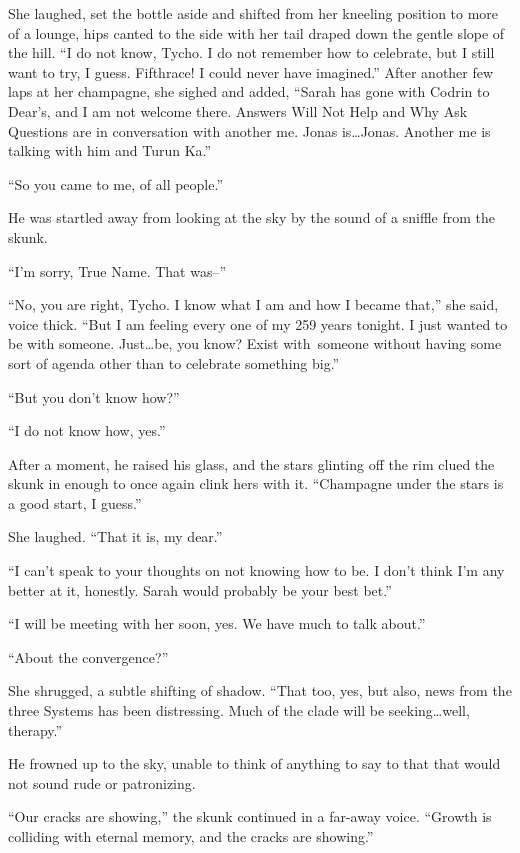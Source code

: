 She laughed, set the bottle aside and shifted from her kneeling position to more of a lounge, hips canted to the side with her tail draped down the gentle slope of the hill. ``I do not know, Tycho. I do not remember how to celebrate, but I still want to try, I guess. Fifthrace! I could never have imagined.'' After another few laps at her champagne, she sighed and added, ``Sarah has gone with Codrin to Dear's, and I am not welcome there. Answers Will Not Help and Why Ask Questions are in conversation with another me. Jonas is\ldots Jonas. Another me is talking with him and Turun Ka.''

``So you came to me, of all people.''

He was startled away from looking at the sky by the sound of a sniffle from the skunk.

``I'm sorry, True Name. That was--''

``No, you are right, Tycho. I know what I am and how I became that,'' she said, voice thick. ``But I am feeling every one of my 259 years tonight. I just wanted to be with someone. Just\ldots be, you know? Exist with\pagebreak~someone without having some sort of agenda other than to celebrate something big.''

``But you don't know how?''

``I do not know how, yes.''

After a moment, he raised his glass, and the stars glinting off the rim clued the skunk in enough to once again clink hers with it. ``Champagne under the stars is a good start, I guess.''

She laughed. ``That it is, my dear.''

``I can't speak to your thoughts on not knowing how to be. I don't think I'm any better at it, honestly. Sarah would probably be your best bet.''

``I will be meeting with her soon, yes. We have much to talk about.''

``About the convergence?''

She shrugged, a subtle shifting of shadow. ``That too, yes, but also, news from the three Systems has been distressing. Much of the clade will be seeking\ldots well, therapy.''

He frowned up to the sky, unable to think of anything to say to that that would not sound rude or patronizing.

``Our cracks are showing,'' the skunk continued in a far-away voice. ``Growth is colliding with eternal memory, and the cracks are showing.''

